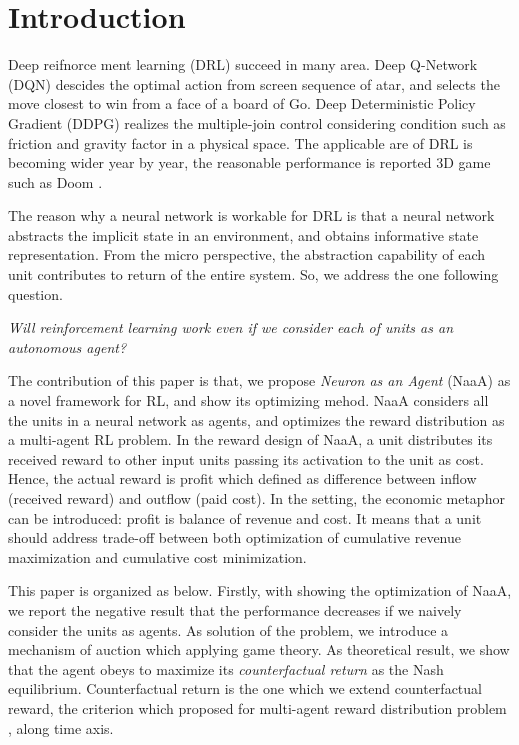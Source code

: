 \section{Introduction}
Deep reifnorce ment learning (DRL) succeed in many area.
Deep Q-Network (DQN) \citep{mnih2015human,silver2016mastering} descides the optimal action from screen sequence of atar, and selects the move closest to win from a face of a board of Go.
Deep Deterministic Policy Gradient (DDPG) \citep{lillicrap2015continuous} realizes the multiple-join control considering condition such as friction and gravity factor in a physical space.
The applicable are of DRL is becoming wider year by year, the reasonable performance is reported 3D game such as Doom \citep{dosovitskiy2016learning}.

The reason why a neural network is workable for DRL is that a neural network abstracts the implicit state in an environment, and obtains informative state representation.
From the micro perspective, the abstraction capability of each unit contributes to return of the entire system.
So, we address the one following question.

\begin{center}
{\em Will reinforcement learning work even if we consider each of units as an autonomous agent?}
\end{center}

The contribution of this paper is that, we propose {\em Neuron as an Agent} (NaaA) as a novel framework for RL, and show its optimizing mehod.
NaaA considers all the units in a neural network as agents, and optimizes the reward distribution as a multi-agent RL problem.
In the reward design of NaaA, a unit distributes its received reward to other input units passing its activation to the unit as cost.
Hence, the actual reward is profit which defined as difference between inflow (received reward) and outflow (paid cost).
In the setting, the economic metaphor can be introduced: profit is balance of revenue and cost. 
It means that a unit should address trade-off between both optimization of cumulative revenue maximization and cumulative cost minimization.

This paper is organized as below.
Firstly, with showing the optimization of NaaA, we report the negative result that the performance decreases if we naively consider the units as agents.
As solution of the problem, we introduce a mechanism of auction which applying game theory.
As theoretical result, we show that the agent obeys to maximize its {\em counterfactual return} as the Nash equilibrium.
Counterfactual return is the one which we extend counterfactual reward, the criterion which proposed for multi-agent reward distribution problem \citep{agogino2006quicr}, along time axis.

